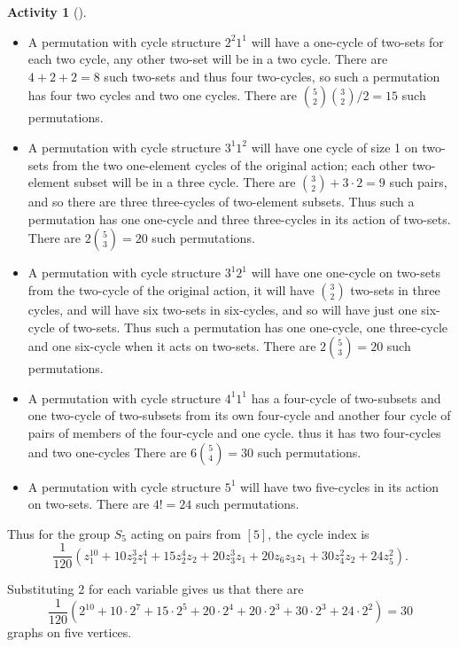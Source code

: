 \documentclass[10pt,]{book}
\theoremstyle{plain}
\theoremstyle{definition}
\newtheorem{activity}[project]{Activity}
\numberwithin{equation}{chapter}
\begin{document}
\begin{activity}[]
\begin{itemize}[label=\textbullet]
\item{}A permutation with cycle structure \(2^2 1^1\) will have a one-cycle of two-sets for each two cycle, any other two-set will be in a  two cycle.  There are \(4+2+2=8\) such two-sets and thus four two-cycles, so such a permutation has four two cycles and two one cycles.  There are \(\binom{5}{2}\binom{3}{2}/2 =15\) such permutations.%
\item{}A permutation with cycle structure \(3^1 1^2\) will have one cycle of size 1 on two-sets from the two one-element cycles of the original action; each other two-element subset will be in a three cycle.  There are \(\binom{3}{2}+3\cdot2=9\) such pairs, and so there are three three-cycles of two-element subsets.  Thus such a permutation has one one-cycle and three three-cycles in its action of two-sets. There are \(2\binom{5}{3}=20\) such permutations.%
\item{}A permutation with cycle structure \(3^1 2^1\) will have one one-cycle on two-sets from the two-cycle of the original action, it will have \(\binom{3}{2}\)  two-sets in three cycles,  and will have six two-sets in six-cycles, and so will have just one six-cycle of two-sets.  Thus such a permutation has one one-cycle, one three-cycle and one six-cycle when it acts on two-sets.  There are \(2\binom{5}{3}=20\) such permutations.%
\item{}A permutation with cycle structure \(4^1 1^1\) has a four-cycle of two-subsets and one two-cycle of two-subsets from its own four-cycle and another four cycle of pairs of members of the four-cycle and one cycle. thus it has two four-cycles and two one-cycles There are \(6\binom{5}{4}=30\) such permutations.%
\item{}A permutation with cycle structure \(5^1\) will have two five-cycles in its action on two-sets.  There are \(4!=24\) such permutations.%
\end{itemize}
Thus for the group \(S_5\) acting on pairs from \([5]\), the cycle index is%
\begin{equation*}
\frac{1}{120}\left(z_1^{10}+10z_2^3z_1^4+15z_2^4z_2+20z_3^3z_1+20z_6z_3z_1+
30z_4^2z_2+ 24z_5^2\right).
\end{equation*}
%
\par
Substituting 2 for each variable gives us that there are%
\begin{equation*}
\frac{1}{120}\left(2^{10}+10\cdot2^7+15\cdot2^5+20\cdot2^4+20\cdot2^3+30\cdot2^3+
24\cdot2^2\right)=30
\end{equation*}
graphs on five vertices.%
\end{activity}
\typeout{************************************************}
\typeout{************************************************}
\end{document}
